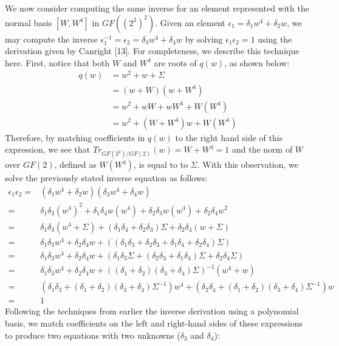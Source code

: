We now consider computing the same inverse for an element represented with the normal basis $[W, W^4]$ in $GF((2^2)^2)$. Given an element $\epsilon_1 = \delta_1 w^4 + \delta_2 w$, we may compute the inverse $\epsilon_1^{-1} = \epsilon_2 = \delta_3 w^4 + \delta_4 w$ by solving $\epsilon_1\epsilon_2 = 1$ using the derivation given by Canright [13]. For completeness, we describe this technique here. First, notice that both $W$ and $W^4$ are roots of $q(w)$, as shown below:
\begin{align*}
q(w) & = w^2 + w + \Sigma \\
& = (w + W)(w + W^4) \\
& = w^2 + wW + wW^4 + W(W^4) \\
& = w^2 + (W + W^4)w + W(W^4)
\end{align*}
Therefore, by matching coefficients in $q(w)$ to the right hand side of this expression, we see that $Tr_{GF(2^2)/GF(2)}(w) = W + W^4 = 1$ and the norm of $W$ over $GF(2)$, defined as $W(W^4)$, is equal to to $\Sigma$. With this observation, we solve the previously stated inverse equation as follows:
\begin{align*}
\epsilon_1\epsilon_2 = & (\delta_1 w^4 + \delta_2 w)(\delta_3 w^4 + \delta_4 w) \\
= & \delta_1\delta_3 (w^4)^2 + \delta_1\delta_4w(w^4) + \delta_2\delta_3w(w^4) + \delta_2\delta_4w^2 \\
= & \delta_1\delta_3 (w^4 + \Sigma) + (\delta_1\delta_4 + \delta_2\delta_3)\Sigma + \delta_2\delta_4(w + \Sigma) \\
= & \delta_1\delta_3 w^4 + \delta_2\delta_4 w + ((\delta_1\delta_3 + \delta_2\delta_3 + \delta_1\delta_4 + \delta_2\delta_4)\Sigma) \\
= & \delta_1\delta_3 w^4 + \delta_2\delta_4 w + (\delta_1\delta_3\Sigma + (\delta_2\delta_3 + \delta_1\delta_4)\Sigma + \delta_2\delta_4\Sigma) \\
= & \delta_1\delta_3 w^4 + \delta_2\delta_4 w + ((\delta_1 + \delta_2)(\delta_3 + \delta_4)\Sigma)^{-1}(w^4 + w) \\
= & (\delta_1\delta_3 + (\delta_1 + \delta_2)(\delta_3 + \delta_4)\Sigma^{-1}) w^4 + (\delta_2\delta_4 + (\delta_1 + \delta_2)(\delta_3 + \delta_4)\Sigma^{-1}) w \\
= & 1
\end{align*}
Following the techniques from earlier the inverse derivation using a polynomial basis, we match coefficients on the left and right-hand sides of these expressions to produce two equations with two unknowns ($\delta_3$ and $\delta_4$):
